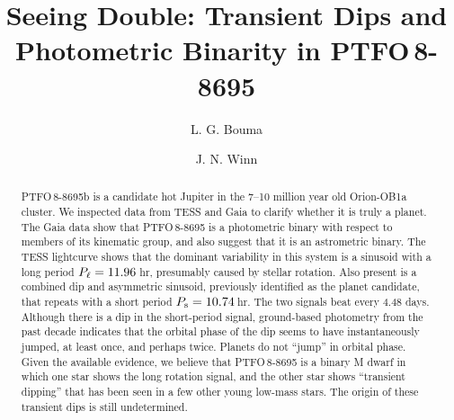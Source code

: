 \documentclass[12pt,twocolumn,tighten]{aastex62}
\begin{document}

\title{Seeing Double: Transient Dips and Photometric Binarity in
PTFO$\,$8-8695}


%
%
\author[0000-0002-0514-5538]{L. G. Bouma}
%
\author[0000-0002-4265-047X]{J. N. Winn}

\begin{abstract}
  PTFO$\,$8-8695b is a candidate hot Jupiter in the 7--10 million year
  old Orion-OB1a cluster. We inspected data from TESS and Gaia to
  clarify whether it is truly a planet.  The Gaia data show that
  PTFO$\,$8-8695 is a photometric binary with respect to members of
  its kinematic group, and also suggest that it is an astrometric
  binary.  The TESS lightcurve shows that the dominant variability in
  this system is a sinusoid with a long period $P_{\rm
  \ell}=11.96\,$hr, presumably caused by stellar rotation.  Also
  present is a combined dip and asymmetric sinusoid, previously
  identified as the planet candidate, that repeats with a short period
  $P_{\rm s}= 10.74\,$hr.  The two signals beat every 4.48 days.
  Although there is a dip in the short-period signal, ground-based
  photometry from the past decade indicates that the orbital phase of
  the dip seems to have instantaneously jumped, at least once, and
  perhaps twice.  Planets do not ``jump'' in orbital phase.  Given the
  available evidence, we believe that PTFO$\,$8-8695 is a binary M
  dwarf in which one star shows the long rotation signal, and the
  other star shows ``transient dipping'' that has been seen in a few
  other young low-mass stars.  The origin of these transient dips is
  still undetermined.
\end{abstract}

\end{document}
